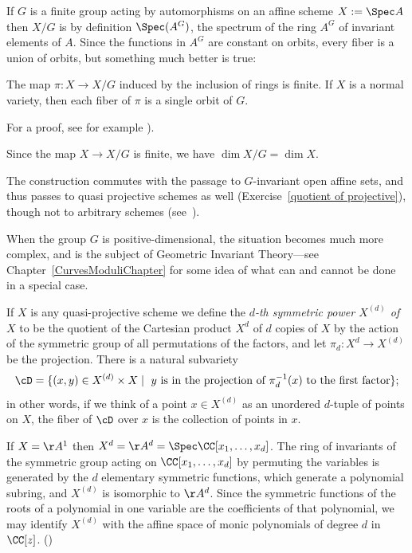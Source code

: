 If $G$ is a finite group acting by automorphisms on an affine scheme $X:=\Spec A$ then $X/G$ is by definition $\Spec(A^G)$, the spectrum of the ring $A^G$ of invariant elements of $A$. Since the functions in $A^{G}$
are constant on orbits, every fiber is a union of orbits, but something much better is true:

\begin{theorem}\label{finite invariant theory}
 The map $\pi: X\to X/G$ induced by the inclusion of rings is finite. If $X$ is a normal variety, then each fiber of $\pi$  is a single orbit of $G$.
 \end{theorem}

For a proof, see for example \cite[Proposition 13.10]{Eisenbud1995}).  

Since the map $X\to X/G$ is finite, we have $\dim X/G = \dim X$. 

The construction commutes with the passage to $G$-invariant open affine sets, and thus passes to quasi projective schemes as well (Exercise~\ref{quotient of projective}), though not to arbitrary schemes (see~\cite[Example 5.3.2]{Olsson}).

When the group $G$ is positive-dimensional, the situation becomes much more complex, and is the subject
of Geometric Invariant Theory---see Chapter~\ref{CurvesModuliChapter} for some  idea of what can and cannot be done
in a special case.

If $X$ is any  quasi-projective scheme we define the \emph{$d$-th symmetric power $X^{(d)}$ of $X$} to be the quotient of the Cartesian product $X^d$ of $d$ copies of $X$ by the action of the symmetric group of all permutations of the factors, and let $\pi_d: X^d\to X^{(d)}$ be the projection. There is a natural
subvariety 
$$
\cD = \{(x,y) \in X^{(d)} \times X\mid \hbox{ $y$ is in the projection of $\pi_d^{-1}(x)$ to the first factor}\};
$$
in other words, if we think of a point $x \in X^{(d)}$ as an unordered $d$-tuple of points on $X$, the fiber of $\cD$ over $x$ is the collection of points in $x$.



If $X=\AA^{1}$ then $X^{d} = \AA^{d} = \Spec \CC[x_{1}, \dots, x_{d}]$. The ring of invariants of the symmetric group acting on
$\CC[x_{1}, \dots, x_{d}]$ by permuting the variables is generated by the $d$ elementary symmetric functions, which generate a polynomial subring, and $X^{(d)}$ is isomorphic to $\AA^{d}$. Since the symmetric functions of the roots of a polynomial in one variable are the coefficients of
that polynomial, we may identify $X^{(d)}$ with the affine space of monic polynomials of degree $d$ in $\CC[z]$. (\cite[Exercises 1.6, 13.2-13.4]{Eisenbud1995})

